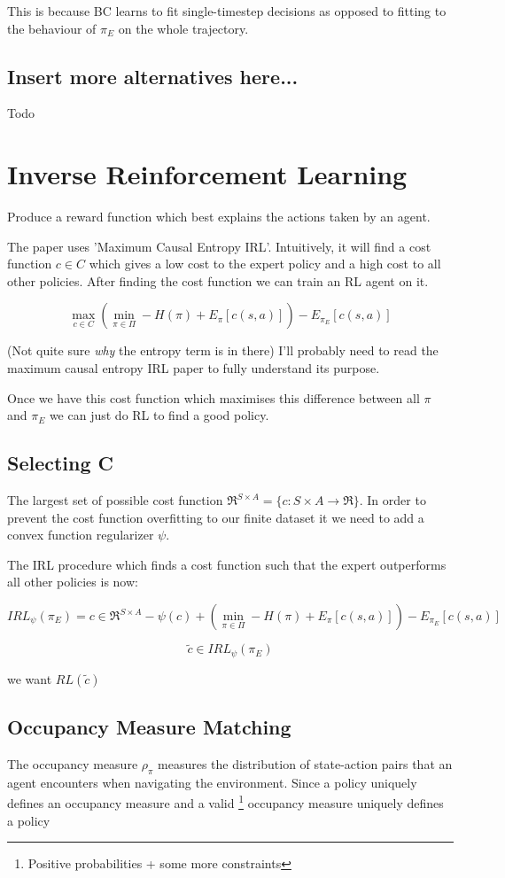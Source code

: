 \documentclass{article}
\begin{document}
This is because BC learns to fit single-timestep decisions as opposed to fitting to the behaviour of \(\pi_{E}\) on the whole trajectory.

\subsection{Insert more alternatives here...}
Todo

\section{Inverse Reinforcement Learning}
Produce a reward function which best explains the actions taken by an agent.

The paper uses 'Maximum Causal Entropy IRL'. Intuitively, it will find a cost function \(c \in C\) which gives a low cost to the expert policy and a high cost to all other policies. After finding the cost function we can train an RL agent on it.

\[\max_{c \in C}\left( \min_{\pi \in \Pi} - H(\pi) + E_{\pi}[c(s,a)] \right) -E_{\pi_{E}}[c(s,a)] \]

(Not quite sure \emph{why} the entropy term is in there) I'll probably need to read the maximum causal entropy IRL paper to fully understand its purpose.

Once we have this cost function which maximises this difference between all \(\pi\) and \(\pi_{E}\) we can just do RL to find a good policy.

\subsection{Selecting C}

The largest set of possible cost function \( \Re^{S \times A} = \{c : S \times A \to \Re\} \).
In order to prevent the cost function overfitting to our finite dataset it we need to add a convex function regularizer \(\psi\).

The IRL procedure which finds a cost function such that the expert outperforms all other policies is now:

\[IRL_{\psi}(\pi_{E}) = {c \in \Re^{S \times A}} - \psi(c) + (\min_{\pi \in \Pi} - H(\pi) + E_{\pi}[c(s,a)]) - E_{\pi_{E}}[c(s,a)]\]

\[\tilde{c} \in IRL_{\psi}(\pi_{E})\]

we want \(RL(\tilde{c})\)

\subsection{Occupancy Measure Matching}
The occupancy measure \(\rho_\pi\) measures the distribution of state-action pairs that an agent encounters when navigating the environment.
Since a policy uniquely defines an occupancy measure and a valid \footnote{Positive probabilities + some more constraints} occupancy measure uniquely defines a policy
\end{document}
